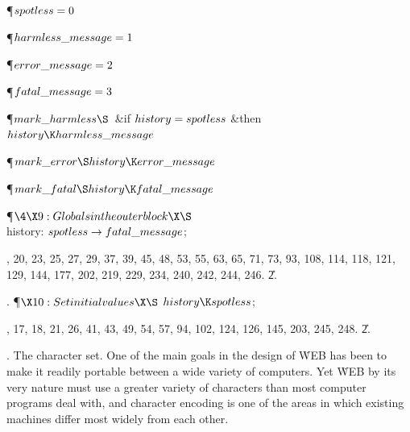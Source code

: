 \Y\P\D {}$\\{spotless}=0$\par
\P\D {}$\\{harmless\_message}=1$\par
\P\D {}$\\{error\_message}=2$\par
\P\D {}$\\{fatal\_message}=3$\Y\par
\P\D {}$\\{mark\_harmless}\S\hbox{}$\ \&{if} $\\{history}=\\{spotless}$ \1%
\&{then}\5
$\\{history}\K\\{harmless\_message}$\2\par
\P\D {}$\\{mark\_error}\S\\{history}\K\\{error\_message}$\par
\P\D {}$\\{mark\_fatal}\S\\{history}\K\\{fatal\_message}$\par
\Y\P$\4\X9:Globals in the outer block\X\S$\6
\4\\{history}: $\\{spotless}\to\\{fatal\_message}$;%
\par
{}, 20\*, 23, 25, 27, 29, 37, 39, 45, 48, 53, 55, 63, 65, 71, 73, 93, 108,
114, 118, 121, 129, 144, 177, 202, 219, 229, 234, 240, 242, 244, 246.
\U2\*.\fi

. \P$\X10:Set initial values\X\S$\6
$\\{history}\K\\{spotless}$;\par
{}, 17, 18, 21\*, 26, 41, 43, 49, 54, 57, 94, 102, 124, 126, 145, 203, 245,
248.
\U2\*.\fi

.  The character set.
One of the main goals in the design of \.{WEB} has been to make it readily
portable between a wide variety of computers. Yet \.{WEB} by its very
nature must use a greater variety of characters than most computer
programs deal with, and character encoding is one of the areas in which
existing machines differ most widely from each other.

